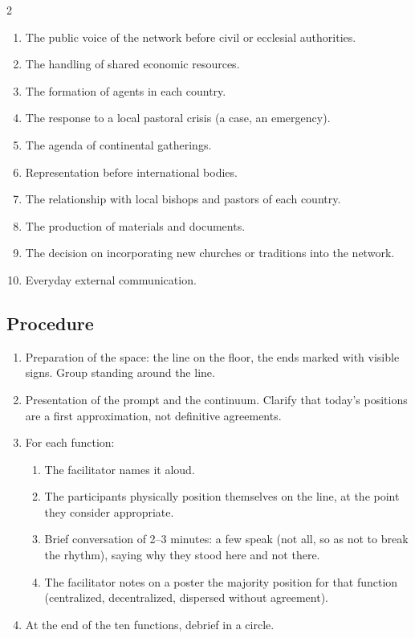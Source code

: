\documentclass[11pt, a4paper]{article}
\begin{document}
\begin{actividad}
\begin{multicols}{2}
\begin{enumerate}[label={\arabic*.}]
  \item The public voice of the network before civil or ecclesial authorities.
  \item The handling of shared economic resources.
  \item The formation of agents in each country.
  \item The response to a local pastoral crisis (a case, an emergency).
  \item The agenda of continental gatherings.
  \item Representation before international bodies.
  \item The relationship with local bishops and pastors of each country.
  \item The production of materials and documents.
  \item The decision on incorporating new churches or traditions into the network.
  \item Everyday external communication.
\end{enumerate}
\end{multicols}

\subsection*{Procedure}
\begin{enumerate}[label={\arabic*.}]
  \item Preparation of the space: the line on the floor, the ends marked with visible signs. Group standing around the line.
  \item Presentation of the prompt and the continuum. Clarify that today's positions are a first approximation, not definitive agreements.
  \item For each function:
    \begin{enumerate}[label={\alph*.}]
      \item The facilitator names it aloud.
      \item The participants physically position themselves on the line, at the point they consider appropriate.
      \item Brief conversation of 2--3 minutes: a few speak (not all, so as not to break the rhythm), saying why they stood here and not there.
      \item The facilitator notes on a poster the majority position for that function (centralized, decentralized, dispersed without agreement).
    \end{enumerate}
  \item At the end of the ten functions, debrief in a circle.
\end{enumerate}


\end{actividad}
\end{document}

